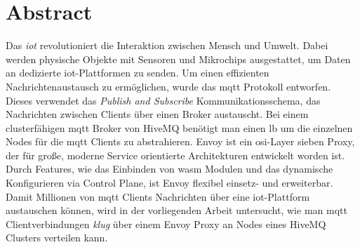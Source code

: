 \section*{Abstract}
Das \textit{\ac{iot}} revolutioniert die Interaktion zwischen Mensch und Umwelt.
Dabei werden physische Objekte mit Sensoren und Mikrochips ausgestattet, um Daten an dedizierte \ac{iot}-Plattformen zu senden.
Um einen effizienten Nachrichtenaustausch zu ermöglichen, wurde das \ac{mqtt} Protokoll entworfen. Dieses verwendet das \textit{Publish and Subscribe} Kommunikationsschema, das Nachrichten zwischen Clients über einen Broker austauscht.
Bei einem clusterfähigen \ac{mqtt} Broker von HiveMQ benötigt man einen \acl{lb} um die einzelnen Nodes für die \ac{mqtt} Clients zu abstrahieren.
Envoy ist ein \acs{osi}-Layer sieben Proxy, der für gro{\ss}e, moderne Service orientierte Architekturen entwickelt worden ist.
Durch Features, wie das Einbinden von \acs{wasm} Modulen und das dynamische Konfigurieren via Control Plane, ist Envoy flexibel einsetz- und erweiterbar.
Damit Millionen von \ac{mqtt} Clients Nachrichten über eine \ac{iot}-Plattform austauschen können, wird in der vorliegenden Arbeit untersucht, wie man \ac{mqtt} Clientverbindungen \textit{klug} über einem Envoy Proxy an Nodes eines HiveMQ Clusters verteilen kann.
\newpage
